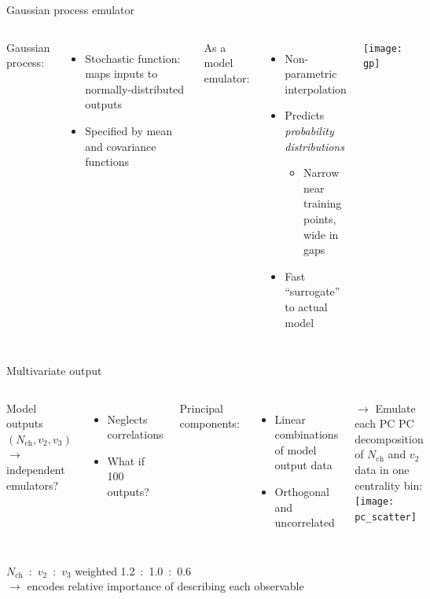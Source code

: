 \documentclass{beamer}
\newcommand{\nch}{N_\text{ch}}
\begin{document}
\begin{frame}{Gaussian process emulator}
  \vspace{1em}
  \begin{columns}[c]
    Gaussian process:
    \begin{itemize}
      \item Stochastic function: maps inputs to normally-distributed outputs
      \item Specified by mean and covariance functions
    \end{itemize}
    \bigskip
    As a model emulator:
    \begin{itemize}
      \item Non-parametric interpolation
      \item Predicts \emph{probability distributions}
        \begin{itemize}
          \item Narrow near training points, \\ wide in gaps
        \end{itemize}
      \item Fast ``surrogate'' to actual model
    \end{itemize}
    \texttt{[image: gp]}
  \end{columns}
\end{frame}


\begin{frame}{Multivariate output}
  \begin{columns}[t]
    Model outputs $(\nch, v_2, v_3)$ \\
    $\rightarrow$ independent emulators?
    \begin{itemize}
      \item Neglects correlations
      \item What if 100 outputs?
    \end{itemize}
    \medskip
    Principal components:
    \begin{itemize}
      \item Linear combinations of model output data
      \item Orthogonal and uncorrelated
    \end{itemize}
    \medskip
    $\rightarrow$ Emulate each PC
    \small
    PC decomposition of $\nch$ and $v_2$ data in one centrality bin: \\[1ex]
    \texttt{[image: pc\_scatter]}
  \end{columns}
  \medskip
  $\nch$~:~$v_2$~:~$v_3$ weighted 1.2~:~1.0~:~0.6 \\
  $\rightarrow$ encodes relative importance of describing each observable
\end{frame}
\end{document}
